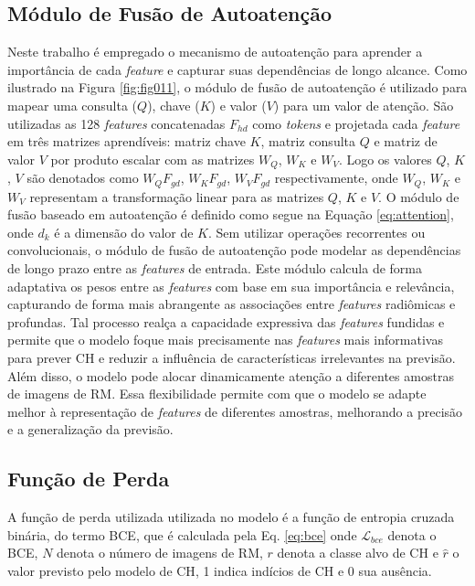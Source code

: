 \subsection{Módulo de Fusão de Autoatenção}
\label{subsec:cap4_mod_self_attention}

Neste trabalho é empregado o mecanismo de autoatenção para aprender a importância de cada \textit{feature} e capturar suas dependências de longo alcance. Como ilustrado na Figura \ref{fig:fig011}, o módulo de fusão de autoatenção é utilizado para mapear uma consulta ($Q$), chave ($K$) e valor ($V$) para um valor de atenção. São utilizadas as 128 \textit{features} concatenadas $F_{hd}$  como \textit{tokens} e projetada cada \textit{feature} em três matrizes aprendíveis: matriz chave $K$, matriz consulta $Q$ e matriz de valor $V$ por produto escalar com as matrizes $W_{Q}$, $W_{K}$ e $W_{V}$. Logo os valores $Q$, $K$, $V$ são denotados como $W_{Q}F_{gd}$, $W_{K}F_{gd}$, $W_{V}F_{gd}$ respectivamente, onde $W_{Q}$, $W_{K}$ e $W_{V}$ representam a transformação linear para as matrizes $Q$, $K$ e $V$. O módulo de fusão baseado em autoatenção é definido como segue na Equação \ref{eq:attention}, onde $d_{k}$ é a dimensão do valor de $K$. Sem utilizar operações recorrentes ou convolucionais, o módulo de fusão de autoatenção pode modelar as dependências de longo prazo entre as \textit{features} de entrada.      Este módulo calcula de forma adaptativa os pesos entre as \textit{features} com base em sua importância e relevância, capturando de forma mais abrangente as associações entre \textit{features} radiômicas e profundas. Tal processo realça a capacidade expressiva das \textit{features} fundidas e permite que o modelo foque mais precisamente nas \textit{features} mais informativas para prever \gls{CH} e reduzir a influência de características irrelevantes na previsão. Além disso, o modelo pode alocar dinamicamente atenção a diferentes amostras de imagens de \gls{RM}. Essa flexibilidade permite com que o modelo se adapte melhor à representação de \textit{features} de diferentes amostras, melhorando a precisão e a generalização da previsão.

\subsection{Função de Perda}
\label{subsec:cap4_funcao_perda}

A função de perda utilizada utilizada no modelo é a função de entropia cruzada binária, do termo  \gls{BCE}, que é calculada pela Eq. \ref{eq:bce} onde $\mathcal{L}_{bce}$ denota o \gls{BCE}, $N$ denota o número de imagens de \gls{RM}, $r$ denota a classe alvo de \gls{CH} e $\hat{r}$ o valor previsto pelo modelo de \gls{CH}, 1 indica indícios de \gls{CH} e 0 sua ausência.

